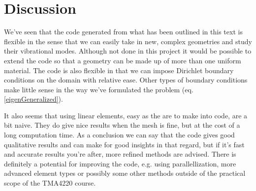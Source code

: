 \documentclass[paper=a4, fontsize=11pt]{scrartcl} %
\begin{document}
\section*{Discussion}
We've seen that the code generated from what has been outlined in this text is flexible in the sense that we can easily take in new, complex geometries and study their vibrational modes. Although not done in this project it would be possible to extend the code so that a geometry can be made up of more than one uniform material. The code is also flexible in that we can impose Dirichlet boundary conditions on the domain with relative ease. Other types of boundary conditions make little sense in the way we've formulated the problem (eq. \ref{eigenGeneralized}).

It also seems that using linear elements, easy as the are to make into code, are a bit naive. They do give nice results when the mesh is fine, but at the cost of a long computation time. As a conclusion we can say that the code gives good qualitative results and can make for good insights in that regard, but if it's fast and accurate results you're after, more refined methods are advised. There is definitely a potential for improving the code, e.g. using parallellization, more advanced element types or possibly some other methods outside of the practical scope of the TMA4220 course.
\end{document}
